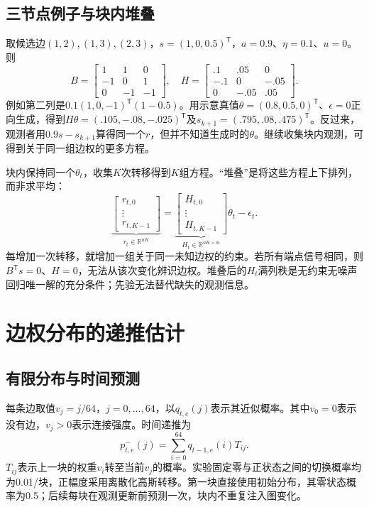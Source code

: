 \documentclass[journal]{IEEEtran}
\newcommand{\T}{\mathsf T}
\begin{document}
\subsection{三节点例子与块内堆叠}
取候选边$(1,2),(1,3),(2,3)$，$s=(1,0,0.5)^\T$，$a=0.9$、$\eta=0.1$、$u=0$。则
\begingroup\setlength{\arraycolsep}{3pt}\begin{equation}
 B=\begin{bmatrix}1&1&0\\-1&0&1\\0&-1&-1\end{bmatrix},\quad
 H=\begin{bmatrix}.1&.05&0\\-.1&0&-.05\\0&-.05&.05\end{bmatrix}.
\end{equation}\endgroup
例如第二列是$0.1(1,0,-1)^\T(1-0.5)$。用示意真值$\theta=(0.8,0.5,0)^\T$、$\epsilon=0$正向生成，得到$H\theta=(.105,-.08,-.025)^\T$及$s_{k+1}=(.795,.08,.475)^\T$。反过来，观测者用$0.9s-s_{k+1}$算得同一个$r$，但并不知道生成时的$\theta$。继续收集块内观测，可得到关于同一组边权的更多方程。

块内保持同一个$\theta_t$，收集$K$次转移得到$K$组方程。“堆叠”是将这些方程上下排列，而非求平均：
\begin{equation}
\underbrace{\begin{bmatrix}r_{t,0}\\\vdots\\r_{t,K-1}\end{bmatrix}}_{r_t\in\mathbb R^{nK}}
=\underbrace{\begin{bmatrix}H_{t,0}\\\vdots\\H_{t,K-1}\end{bmatrix}}_{H_t\in\mathbb R^{nK\times m}}\theta_t-\epsilon_t.\label{eq:stack}
\end{equation}
每增加一次转移，就增加一组关于同一未知边权的约束。若所有端点信号相同，则$B^\T s=0$、$H=0$，无法从该次变化辨识边权。堆叠后的$H_t$满列秩是无约束无噪声回归唯一解的充分条件；先验无法替代缺失的观测信息。

\section{边权分布的递推估计}
\subsection{有限分布与时间预测}
每条边取值$v_j=j/64$，$j=0,\ldots,64$，以$q_{t,e}(j)$表示其近似概率。其中$v_0=0$表示没有边，$v_j>0$表示连接强度。时间递推为
\begin{equation}
 p^-_{t,e}(j)=\sum_{i=0}^{64}q_{t-1,e}(i)T_{ij}.\label{eq:predict}
\end{equation}
$T_{ij}$表示上一块的权重$v_i$转至当前$v_j$的概率。实验固定零与正状态之间的切换概率均为0.01/块，正幅度采用离散化高斯转移。第一块直接使用初始分布，其零状态概率为0.5；后续每块在观测更新前预测一次，块内不重复注入图变化。
\end{document}
